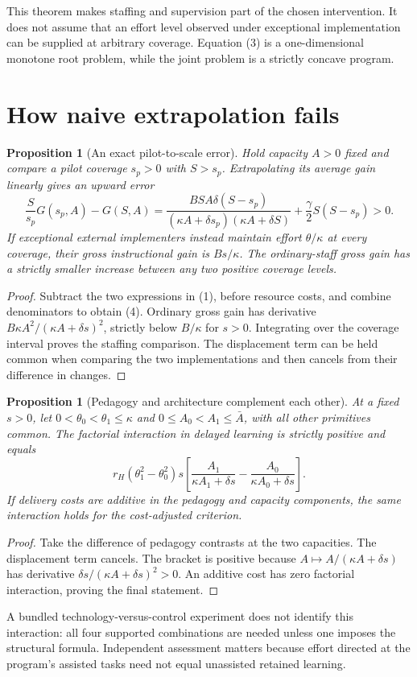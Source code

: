 \documentclass[11pt,a4paper]{article}
\newtheorem{proposition}[theorem]{Proposition}
\theoremstyle{remark}
\begin{document}
This theorem makes staffing and supervision part of the chosen intervention. It does not assume that an effort level observed under exceptional implementation can be supplied at arbitrary coverage. Equation (3) is a one-dimensional monotone root problem, while the joint problem is a strictly concave program.

\section{How naive extrapolation fails}
\begin{proposition}[An exact pilot-to-scale error]
Hold capacity $A>0$ fixed and compare a pilot coverage $s_p>0$ with $S>s_p$. Extrapolating its average gain linearly gives an upward error
\[
 \frac{S}{s_p}G(s_p,A)-G(S,A)
 =\frac{BSA\delta(S-s_p)}{(\kappa A+\delta s_p)(\kappa A+\delta S)}
 +\frac\gamma2S(S-s_p)>0. \tag{4}
\]
If exceptional external implementers instead maintain effort $\theta/\kappa$ at every coverage, their gross instructional gain is $Bs/\kappa$. The ordinary-staff gross gain has a strictly smaller increase between any two positive coverage levels.
\end{proposition}
\begin{proof}
Subtract the two expressions in (1), before resource costs, and combine denominators to obtain (4). Ordinary gross gain has derivative $B\kappa A^2/(\kappa A+\delta s)^2$, strictly below $B/\kappa$ for $s>0$. Integrating over the coverage interval proves the staffing comparison. The displacement term can be held common when comparing the two implementations and then cancels from their difference in changes.
\end{proof}

\begin{proposition}[Pedagogy and architecture complement each other]
At a fixed $s>0$, let $0<\theta_0<\theta_1\le\kappa$ and $0\le A_0<A_1\le\bar A$, with all other primitives common. The factorial interaction in delayed learning is strictly positive and equals
\[
 r_H(\theta_1^2-\theta_0^2)s
 \left[\frac{A_1}{\kappa A_1+\delta s}
       -\frac{A_0}{\kappa A_0+\delta s}\right].
\]
If delivery costs are additive in the pedagogy and capacity components, the same interaction holds for the cost-adjusted criterion.
\end{proposition}
\begin{proof}
Take the difference of pedagogy contrasts at the two capacities. The displacement term cancels. The bracket is positive because $A\mapsto A/(\kappa A+\delta s)$ has derivative $\delta s/(\kappa A+\delta s)^2>0$. An additive cost has zero factorial interaction, proving the final statement.
\end{proof}
A bundled technology-versus-control experiment does not identify this interaction: all four supported combinations are needed unless one imposes the structural formula. Independent assessment matters because effort directed at the program's assisted tasks need not equal unassisted retained learning.
\end{document}
